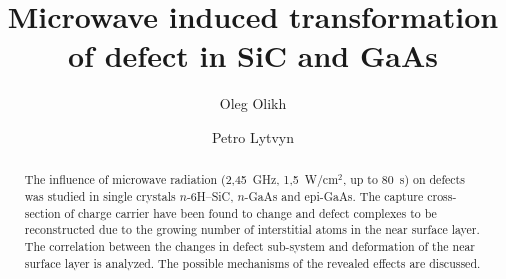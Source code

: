 \documentclass[final,3p,times,twocolumn,authoryear]{elsarticle}
\begin{document}
\begin{frontmatter}



\title{Microwave induced transformation of defect in SiC and GaAs}

\author[label1]{Oleg Olikh}

\author[label2]{Petro Lytvyn}


\begin{abstract}
The influence of microwave radiation (2,45~GHz, 1,5~W/cm$^2$, up to 80~s) on defects was studied in single crystals $n$-6H–SiC, $n$-GaAs and epi-GaAs.
The capture cross-section of charge carrier have been found to change
and defect complexes to be reconstructed due to the growing number of  interstitial atoms in the near surface layer.
The correlation between the changes in defect sub-system and deformation of the near surface layer is analyzed.
The possible mechanisms of the revealed effects are discussed.
\end{abstract}


\end{frontmatter}
\end{document}
